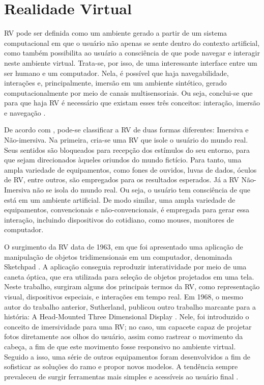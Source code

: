 \section{Realidade Virtual}
\label{sec:precisaorecall}

RV pode ser definida como um ambiente gerado a partir de um sistema computacional em que o usuário não apenas se sente dentro do contexto artificial, como também possibilita ao usuário a consciência de que pode navegar e interagir neste ambiente virtual. Trata-se, por isso, de uma interessante interface entre um ser humano e um computador. Nela, é possível que haja navegabilidade, interações e, principalmente, imersão em um ambiente sintético, gerado computacionalmente por meio de canais multisensoriais. Ou seja, conclui-se que para que haja RV é necessário que existam esses três conceitos: interação, imersão e navegação \cite{kalawsky1993science}.

De acordo com , pode-se classificar a RV de duas formas diferentes: Imersiva e Não-imersiva. Na primeira, cria-se uma RV que isole o usuário do mundo real. Seus sentidos são bloqueados para recepção dos estímulos do seu entorno, para que sejam direcionados àqueles oriundos do mundo fictício. Para tanto, uma ampla variedade de equipamentos, como fones de ouvidos, luvas de dados, óculos de RV, entre outros, são empregados para os resultados esperados. Já a RV Não-Imersiva não se isola do mundo real. Ou seja, o usuário tem consciência de que está em um ambiente artificial. De modo similar, uma ampla variedade de equipamentos, convencionais e não-convencionais, é empregada para gerar essa interação, incluindo dispositivos do cotidiano, como mouses, monitores de computador.

O surgimento da RV data de 1963, em que foi apresentado uma aplicação de manipulação de objetos tridimensionais em um computador, denominada Sketchpad \cite{sutherland1963sketchpad}. A aplicação conseguia reproduzir interatividade por meio de uma caneta óptica, que era utilizada para seleção de objetos projetados em uma tela. Neste trabalho, surgiram alguns dos principais termos da RV, como representação visual, dispositivos especiais, e interações em tempo real. Em 1968, o mesmo autor do trabalho anterior, Sutherland, publicou outro trabalho marcante para a história: A Head-Mounted Three Dimensional Display \cite{sutherland1968head}. Nele, foi introduzido o conceito de imersividade para uma RV; no caso, um capacete capaz de projetar fotos diretamente aos olhos do usuário, assim como rastrear o movimento da cabeça, a fim de que este movimento fosse responsivo no ambiente virtual. Seguido a isso, uma série de outros equipamentos foram desenvolvidos a fim de sofisticar as soluções do ramo e propor novos modelos. A tendência sempre prevaleceu de surgir ferramentas mais simples e acessíveis ao usuário final \cite{kirner2011evoluccao}.

